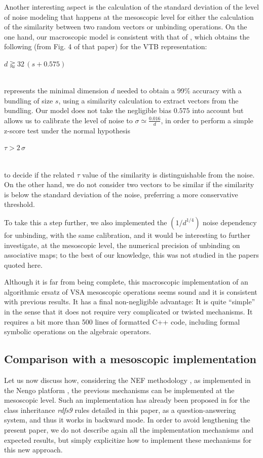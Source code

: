 \documentclass[sn-mathphys]{sn-jnl}
\newcommand{\eqline}[1]{~\vspace{0.1cm}\\\centerline{$#1$}\vspace{0.1cm}\\}
\begin{document}
Another interesting aspect is the calculation of the standard deviation of the level of noise modeling that happens at the mesoscopic level for either the calculation of the similarity between two random vectors or unbinding operations. On the one hand, our macroscopic model is consistent with that of \cite{schlegel_comparison_2020}, which obtains the following (from Fig. 4 of that paper) for the VTB representation:
\eqline{d \gtrapprox 32 \, (s + 0.575)}
represents the minimal dimension $d$ needed to obtain a 99\% accuracy with a bundling of size $s$, using a similarity calculation to extract vectors from the bundling. Our model does not take the negligible bias $0.575$ into account but allows us to calibrate the level of noise to $\sigma \simeq \frac{0.016}{d}$, in order to perform a simple z-score test under the normal hypothesis
\eqline{\tau > 2 \, \sigma}
to decide if the related $\tau$ value of the similarity is distinguishable from the noise. On the other hand, we do not consider two vectors to be similar if the similarity is below the standard deviation of the noise, preferring a more conservative threshold.

To take this a step further, we also implemented the $(1/d^{1/4})$ noise dependency for unbinding, with the same calibration, and it would be interesting to further investigate, at the mesoscopic level, the numerical precision of unbinding on associative maps; to the best of our knowledge, this was not studied in the papers quoted here.

Although it is far from being complete, this macroscopic implementation of an algorithmic ersatz of VSA mesoscopic operations seems sound and it is consistent with previous results. It has a final non-negligible advantage: It is quite ``simple'' in the sense that it does not require very complicated or twisted mechanisms. It requires a bit more than 500 lines of formatted C++ code, including formal symbolic operations on the algebraic operators.

\subsection{Comparison with a mesoscopic implementation}\label{nengo}

Let us now discuss how, considering the NEF methodology \cite{eliasmith_how_2013}, as implemented in the Nengo platform \cite{bekolay_nengo_2014}, the previous mechanisms can be implemented at the mesoscopic level. Such an implementation has already been proposed in \cite{mercier_ontology_2021} for the class inheritance \textit{rdfs9} rules detailed in this paper, as a question-answering system, and thus it works in backward mode. In order to avoid lengthening the present paper, we do not describe again all the implementation mechanisms and expected results, but simply explicitize how to implement these mechanisms for this new approach. %
\end{document}
